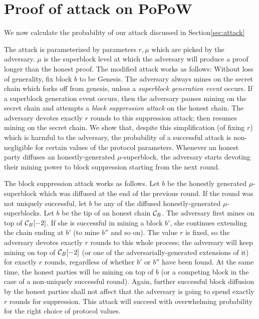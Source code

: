 \section{Proof of attack on PoPoW}
\label{sec:attack-full}
We now calculate the probability of our attack discussed in Section\ref{sec:attack}

The attack is
parameterized by  parameters $r, \mu$ which are picked by the adversary. $\mu$
is the superblock level at which the adversary will produce a proof longer than
the honest proof. The modified attack works as follows: Without loss of
generality, fix block $b$ to be Genesis. The adversary always mines on the
secret chain which forks off from genesis, unless a \textit{superblock
generation event} occurs. If a superblock generation event occurs, then the
adversary pauses mining on the secret chain and attempts a \textit{block
suppression attack} on the honest chain. The adversary devotes exactly $r$
rounds to this suppression attack; then resumes mining on the secret chain. We
show that, despite this simplification (of fixing $r$) which is harmful to the
adversary, the probability of a successful attack is non-negligible for certain
values of the protocol parameters.
%
Whenever an
honest party diffuses an honestly-generated $\mu$-superblock,
the adversary starts devoting their mining power to block suppression
starting from the next round.

The block suppression attack works as follows. Let $b$ be the honestly generated
$\mu$-superblock which was diffused at the end of the previous round. If the
round was not uniquely successful, let $b$ be any of the diffused
honestly-generated $\mu$-superblocks. Let $b$ be the tip of an honest chain
$\mathcal{C}_B$. The adversary first mines on top of $\mathcal{C}_B[-2]$. If she is
successful in mining a block $b'$, she continues extending the chain ending
at $b'$ (to mine $b''$ and so on). The value $r$ is fixed, so the adversary
devotes exactly $r$ rounds to this whole process; the adversary will keep mining
on top of $\mathcal{C}_B[-2]$ (or one of the adversarially-generated extensions of
it) for exactly $r$ rounds, regardless of whether $b'$ or $b''$ have been found.
At the same time, the honest parties will be mining on top of $b$ (or a
competing block in the case of a non-uniquely successful round). Again, further
successful block diffusion by the honest parties shall not affect that the
adversary is going to spend exactly $r$ rounds for suppression.
This attack will succeed with overwhelming probability for the right choice
of protocol values.


